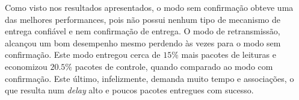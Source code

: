Como visto nos resultados apresentados, o modo sem confirmação obteve uma das melhores performances, pois não possui nenhum tipo de mecanismo de entrega confiável e nem confirmação de entrega. O modo de retransmissão, alcançou um bom desempenho mesmo perdendo às vezes para o modo sem confirmação. Este modo entregou cerca de $15\%$ mais pacotes de leituras e economizou $20.5\%$ pacotes de controle, quando comparado ao modo com confirmação. Este último, infelizmente, demanda muito tempo e associações, o que resulta num \textit{delay} alto e poucos pacotes entregues com sucesso.




